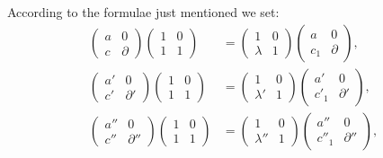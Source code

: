 \documentclass[11pt]{article}
\begin{document}
According to the formulae just mentioned we set:
\begin{equation}
\begin{aligned}
\begin{pmatrix}a&0\\ c&\partial\end{pmatrix}
\begin{pmatrix}1&0\\ 1&1\end{pmatrix}
&=
\begin{pmatrix}1&0\\ \lambda&1\end{pmatrix}
\begin{pmatrix}a&0\\ c_1&\partial\end{pmatrix},\\
\begin{pmatrix}a'&0\\ c'&\partial'\end{pmatrix}
\begin{pmatrix}1&0\\ 1&1\end{pmatrix}
&=
\begin{pmatrix}1&0\\ \lambda'&1\end{pmatrix}
\begin{pmatrix}a'&0\\ c'_1&\partial'\end{pmatrix},\\
\begin{pmatrix}a''&0\\ c''&\partial''\end{pmatrix}
\begin{pmatrix}1&0\\ 1&1\end{pmatrix}
&=
\begin{pmatrix}1&0\\ \lambda''&1\end{pmatrix}
\begin{pmatrix}a''&0\\ c''_1&\partial''\end{pmatrix},
\end{aligned}
\tag{5}
\end{equation}
\end{document}
